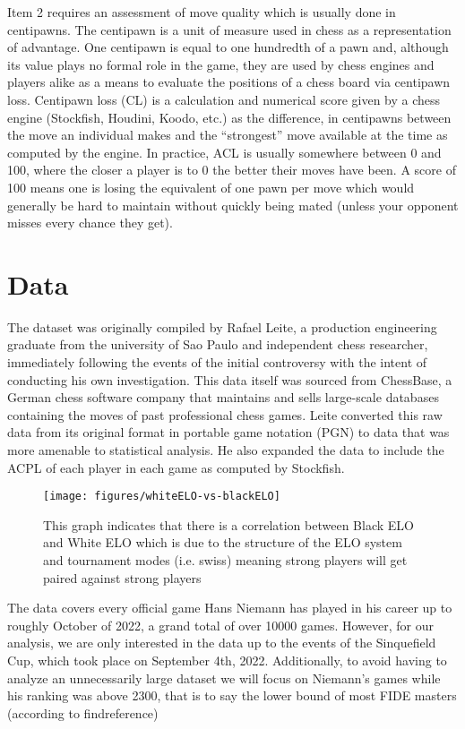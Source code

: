 \documentclass[12pt, letterpaper, titlepage]{article}
\begin{document}
Item 2 requires an assessment of move quality which is usually done in centipawns. The centipawn is a unit of measure used in chess as a representation of advantage. One centipawn is equal to one hundredth of a pawn and, although its value plays no formal role in the game, they are used by chess engines and players alike as a means to evaluate the positions of a chess board via centipawn loss. Centipawn loss (CL) is a calculation and numerical score given by a chess engine  (Stockfish, Houdini, Koodo, etc.) as the difference, in centipawns between the move an individual makes and the “strongest” move available at the time as computed by the engine.
In practice, ACL is usually somewhere between 0 and 100, where the closer a player is to 0 the better their moves have been. A score of 100 means one is losing the equivalent of one pawn per move which would generally be hard to maintain without quickly being mated (unless your opponent misses every chance they get).

\section*{Data}
\label{sec:data}

The dataset was originally compiled by Rafael Leite, a production engineering graduate from the university of Sao Paulo and independent chess researcher, immediately following the events of the initial controversy with the intent of conducting his own investigation. This data itself was sourced from ChessBase, a German chess software company that maintains and sells large-scale databases containing the moves of past professional chess games. Leite converted this raw data from its original format in portable game notation (PGN) to data that was more amenable to statistical analysis. He also expanded the data to include the ACPL of each player in each game as computed by Stockfish.

\begin{figure}[!htb]
    \centering
    \texttt{[image: figures/whiteELO-vs-blackELO]}
    \caption{This graph indicates that there is a correlation between Black ELO and White ELO which is due to the structure of the ELO system and tournament modes (i.e. swiss) meaning strong players will get paired against strong players}
    \label{fig:elo_lineplot}
\end{figure}

The data covers every official game Hans Niemann has played in his career up to roughly October of 2022, a grand total of over 10000 games. However, for our analysis, we are only interested in the data up to the events of the Sinquefield Cup, which took place on September 4th, 2022. Additionally, to avoid having to analyze an unnecessarily large dataset we will focus on Niemann's games while his ranking was above 2300, that is to say the lower bound of most FIDE masters (according to findreference)
\end{document}
